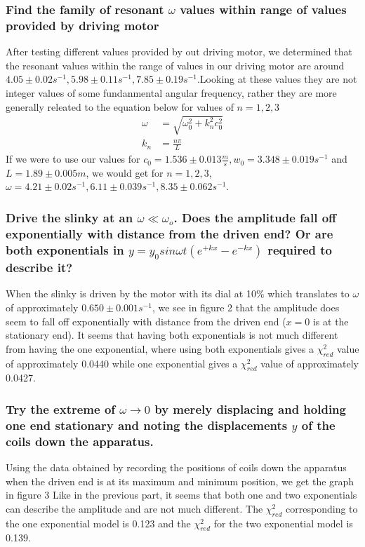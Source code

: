 \documentclass{article}
\begin{document}
\subsubsection*{Find the family of resonant $\omega$ values within range of
values provided by driving motor}
After testing different values provided by out driving motor, we determined that
the resonant values within the range of values in our driving motor are around
$4.05 \pm 0.02s^{-1}, 5.98 \pm 0.11 s^{-1}, 7.85 \pm 0.19s^{-1}$.Looking at
these values they are not integer values of some
fundanmental angular frequency, rather they are more generally releated to the
equation below for values of $n = 1,2,3$
\begin{align*}
    \omega &= \sqrt{\omega_0^2 + k_n^2c_0^2}\\
    k_n &= \frac{n\pi}{L}
\end{align*}
If we were to use our values for $c_0 = 1.536 \pm 0.013 \frac{m}{s}, w_0 =
3.348\pm0.019 s^{-1}$ and $L = 1.89\pm 0.005m$, we would get for $n = 1, 2, 3$,
$\omega = 4.21 \pm 0.02s^{-1}, 6.11 \pm 0.039s^{-1}, 8.35 \pm 0.062s^{-1}$.

\subsubsection*{Drive the slinky at an $\omega\ll\omega_{o}$.  
Does the amplitude fall off exponentially with distance
from the driven end?  Or are both exponentials in $y=y_{0}sin\omega 
t(e^{+kx}-e^{-kx})$ required to describe it?}
When the slinky is driven by the motor with its dial at 10\% which translates 
to $\omega$ of approximately $0.650\pm0.001s^{-1}$, we see in figure 2 
that the amplitude does seem to fall off exponentially with distance from
the driven end ($x=0$ is at the stationary end).  It seems that having both
exponentials is not much different from having the one exponential, where 
using both exponentials gives a $\chi_{red}^{2}$ value of approximately 
0.0440 while one exponential gives a $\chi_{red}^{2}$ value of approximately 
0.0427.

\subsubsection*{Try the extreme of $\omega\rightarrow0$ by merely displacing 
and holding one end stationary and noting the displacements $y$ of the coils 
down the apparatus.}
Using the data obtained by recording the positions of coils down the apparatus 
when the driven end is at its maximum and minimum position, we get the graph in
figure 3  Like in the previous part, it seems that both one and two 
exponentials can describe the amplitude and are not much different.  The 
$\chi_{red}^{2}$ corresponding to the one exponential model is 0.123 and the
$\chi_{red}^{2}$ for the two exponential model is 0.139.
\end{document}

